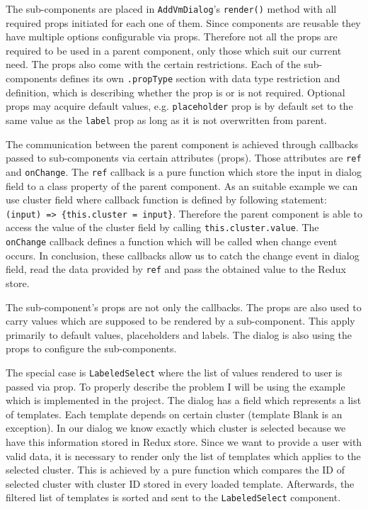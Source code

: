 The sub-components are placed in \texttt{AddVmDialog}'s \texttt{render()} method with all required props initiated for each one of them. Since components are reusable they have multiple options configurable via props. Therefore not all the props are required to be used in a parent component, only those which suit our current need. The props also come with the certain restrictions. Each of the sub-components defines its own \texttt{.propType} section with data type restriction and definition, which is describing whether the prop is or is not required. Optional props may acquire default values, e.g. \texttt{placeholder} prop is by default set to the same value as the \texttt{label} prop as long as it is not overwritten from parent.

The communication between the parent component is achieved through callbacks passed to sub-components via certain attributes (props). Those attributes are \texttt{ref} and \texttt{onChange}. The \texttt{ref} callback is a pure function which store the input in dialog field to a class property of the parent component. As an suitable example we can use cluster field where callback function is defined by following statement: \texttt{(input) => \{this.cluster = input\}}. Therefore the parent component is able to access the value of the cluster field by calling \texttt{this.cluster.value}. The \texttt{onChange} callback defines a function which will be called when change event occurs. In conclusion, these callbacks allow us to catch the change event in dialog field, read the data provided by \texttt{ref} and pass the obtained value to the Redux store.

The sub-component's props are not only the callbacks. The props are also used to carry values which are supposed to be rendered by a sub-component. This apply primarily to default values, placeholders and labels. The dialog is also using the props to configure the sub-components. 

The special case is \texttt{LabeledSelect} where the list of values rendered to user is passed via prop. To properly describe the problem I will be using the example which is implemented in the project. The dialog has a field which represents a list of templates. Each template depends on certain cluster (template Blank is an exception). In our dialog we know exactly which cluster is selected because we have this information stored in Redux store. Since we want to provide a user with valid data, it is necessary to render only the list of templates which applies to the selected cluster. This is achieved by a pure function which compares the ID of selected cluster with cluster ID stored in every loaded template. Afterwards, the filtered list of templates is sorted and sent to the \texttt{LabeledSelect} component.

